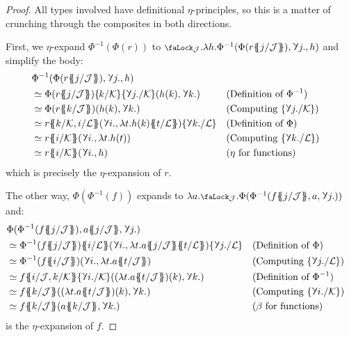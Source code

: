 \documentclass[10pt]{article}
\theoremstyle{definition}
\let\oldequiv\equiv%
\renewcommand{\equiv}{\simeq}
\newcommand{\defeq}{\oldequiv}
\newcommand{\lock}{\mathchoice {\scalebox{0.8}{\text{\faLock}}}
  {\scalebox{0.8}{\text{\faLock}}} {\scalebox{0.5}{\text{\faLock}}}
  {\scalebox{0.4}{\text{\faLock}}} }
\newcommand{\rbindsym}{%
  \mathchoice
    {\reflectbox{\rotatebox[origin=c]{185}{$\lambda$}}}  %
    {\reflectbox{\rotatebox[origin=c]{185}{$\lambda$}}}  %
    {\reflectbox{\rotatebox[origin=c]{185}{$\scriptstyle\lambda$}}}  %
    {\reflectbox{\rotatebox[origin=c]{185}{$\scriptscriptstyle\lambda$}}}  %
  }
\newcommand{\rbind}[1]{\rbindsym{} #1.}
\newcommand{\lockn}[1]{\mathcal{#1}}
\newcommand{\stubra}[1]{\{\!\!\{ #1 \}\!\!\}}
\newcommand{\admbra}[1]{\{\mkern-1mu #1 \mkern-0.5mu\}}
\newcommand{\subkeysep}[2]{#1/#2}
\newcommand{\subkeyo}[2]{\subkeysep{#1}{\lockn{#2}}}
\newcommand{\subkey}[2]{\admbra{\subkeyo{#1}{#2}}}
\newcommand{\substuck}[2]{\stubra{#1/\lockn{#2}}}
\newcommand{\sublock}[2]{\admbra{\rbindsym{} #1. /\lockn{#2} }}
\newcommand{\rintroe}[2]{\lock_{#1}. #2}
\newcommand{\rintro}[2]{\rintroe{\lockn{#1}}{#2}}
\begin{document}
\begin{proof}
  All types involved have definitional $\eta$-principles, so this is a
  matter of crunching through the composites in both directions.

  First, we $\eta$-expand $\Phi^{-1}(\Phi(r))$ to $\rintro{J} \lambda h. \Phi^{-1}(\Phi(r\substuck{j}{J}), \rbind{j}, h)$ and simplify the body:
  \begin{align*}
    &\Phi^{-1}(\Phi(r\substuck{j}{J}), \rbind{j}, h) \\
    &\defeq \Phi(r\substuck{j}{J})\subkey{k}{K}\sublock{j}{K}(h(k), \rbind k)
    && \text{(Definition of $\Phi^{-1}$)} \\
    &\defeq \Phi(r\substuck{k}{J})(h(k), \rbind k)
    && \text{(Computing $\sublock{j}{K}$)} \\
    &\defeq r\stubra{\subkeyo{k}{K},\subkeyo{i}{L}}(\rbind{i}, \lambda t. h(k) \substuck{t}{L}) \sublock{k}{L}
    && \text{(Definition of $\Phi$)} \\
    &\defeq r\substuck{i}{K}(\rbind{i}, \lambda t. h(t))
    && \text{(Computing $\sublock{k}{L}$)} \\      
    &\defeq r\substuck{i}{K}(\rbind{i}, h)
    && \text{($\eta$ for functions)}
  \end{align*}
  which is precisely the $\eta$-expansion of $r$.

  The other way, $\Phi(\Phi^{-1}(f))$ expands to $\lambda a. \rintro{J} \Phi (\Phi^{-1}(f\substuck{j}{J}, a, \rbind{j}))$ and:
  \begin{align*}
    &\Phi (\Phi^{-1}(f\substuck{j}{J}), a\substuck{j}{J}, \rbind{j}) \\
    &\defeq \Phi^{-1}(f\substuck{j}{J})\substuck{i}{L}(\rbind{i}, \lambda t. a\substuck{j}{J} \substuck{t}{L})\sublock{j}{L}
    && \text{(Definition of $\Phi$)} \\
    &\defeq \Phi^{-1}(f\substuck{i}{J})(\rbind{i}, \lambda t. a\substuck{t}{J})
    && \text{(Computing $\sublock{j}{L}$)} \\
    &\defeq f\stubra{\subkeyo{i}{J}, \subkeyo{k}{K}}\sublock{i}{K}((\lambda t. a \substuck{t}{J})(k), \rbind{k})
    && \text{(Definition of $\Phi^{-1}$)} \\
    &\defeq f\substuck{k}{J}((\lambda t. a \substuck{t}{J})(k), \rbind{k})
    && \text{(Computing $\sublock{i}{K}$)} \\
    &\defeq f\substuck{k}{J}(a \substuck{k}{J}, \rbind{k})
    && \text{($\beta$ for functions)}
  \end{align*}
  is the $\eta$-expansion of $f$.
  

\end{proof}
\end{document}

